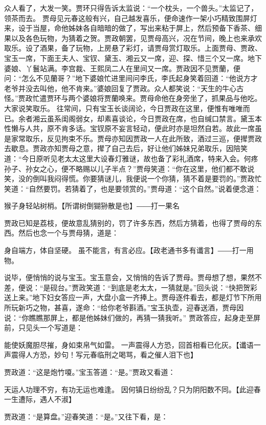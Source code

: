\documentclass[12pt,oneside]{book}
\begin{document}
众人看了，大发一笑。贾环只得告诉太监说：“一个枕头，一个兽头。”太监记了，领茶而去。
贾母见元春这般有兴，自己越发喜乐，便命速作一架小巧精致围屏灯来，设于当屋，命他姊妹各自暗暗的做了，写出来粘于屏上，然后预备下香茶、细果以及各色玩物，为猜着之贺。贾政朝罢，见贾母高兴，况在节间，晚上也来承欢取乐。设了酒果，备了玩物，上房悬了彩灯，请贾母赏灯取乐。上面贾母、贾政、宝玉一席，下面王夫人、宝钗、黛玉、湘云又一席，迎、探、惜三个又一席。地下婆娘、丫鬟站满。李宫裁、王熙凤二人在里间又一席。贾政因不见贾蘭，便问：“怎么不见蘭哥？”地下婆娘忙进里间问李氏，李氏起身笑着回道：“他说方才老爷并没去叫他，他不肯来。”婆娘回复了贾政。众人都笑说：“天生的牛心古怪。”贾政忙遣贾环与两个婆娘将贾蘭唤来。贾母命他在身旁坐了，抓果品与他吃。大家说笑取乐。
往常间，只有宝玉长谈阔论，今日贾政在这里，便惟有唯唯而已。余者湘云虽系闺阁弱女，却素喜谈论，今日贾政在席，也自缄口禁言。黛玉本性懒与人共，原不肯多话。宝钗原不妄言轻动，便此时亦是坦然自若。故此一席虽是家常取乐，反见拘束不乐。贾母亦知因贾政一人在此所致，酒过三巡，便撵贾政去歇息。贾政亦知贾母之意，撵了自己去后，好让他们姊妹兄弟取乐，因陪笑道：“今日原听见老太太这里大设春灯雅谜，故也备了彩礼酒席，特来入会。何疼孙子、孙女之心，便不略赐以儿子半点？”贾母笑道：“你在这里，他们都不敢说笑，没的倒叫我闷得慌。你要猜谜儿，我便说一个你猜，猜不着是要罚的。”贾政忙笑道：“自然要罚。若猜着了，也是要领赏的。”贾母道：“这个自然。”说着便念道：

猴子身轻站树梢。【所谓树倒猢狲散是也】――打一果名

贾政已知是荔枝，便故意乱猜别的，罚了许多东西，然后方猜着，也得了贾母的东西。然后也念一个与贾母猜，道是：

身自端方，体自坚硬。
虽不能言，有言必应。【政老通书多有谶言】――打一用物。

说毕，便悄悄的说与宝玉。宝玉意会，又悄悄的告诉了贾母。贾母想了想，果然不差，便说：“是砚台。”贾政笑道：“到底是老太太，一猜就是。”回头说：“快把贺彩送上来。”地下妇女答应一声，大盘小盒一齐捧上。贾母逐件看去，都是灯节下所用所玩新巧之物，甚喜，遂命：“给你老爷斟酒。”宝玉执壶，迎春送酒，贾母因说：“你瞧瞧那屏上，都是他姊妹们做的，再猜一猜我听。”
贾政答应，起身走至屏前，只见头一个写道是：

能使妖魔胆尽摧，身如束帛气如雷。
一声震得人方恐，回首相看已化灰。【谶语一声震得人方恐，妙句！写元春临刑之喝骂，看之催人泪下也】


贾政道：“这是炮竹嗄。”宝玉答道：“是。”贾政又看道：

天运人功理不穷，有功无运也难逢。
因何镇日纷纷乱？只为阴阳数不同。【此迎春一生遭际，遇人不淑】

贾政道：“是算盘。”迎春笑道：“是。”又往下看，是：
\end{document}
